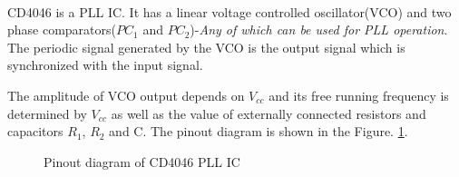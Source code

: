 \paragraph{}


CD4046 is a PLL IC. It has a linear voltage controlled oscillator(VCO) and two phase comparators($PC_1$ and $PC_2$)-\emph{Any of which can be used for PLL operation}. The periodic signal generated by the VCO is the output signal which is synchronized with the input signal. 

The amplitude of VCO output depends on $V_{cc}$ and its free running frequency is determined by $V_{cc}$ as well as the value of externally connected resistors and capacitors $R_1$, $R_2$ and C. The pinout diagram is shown in the Figure. \ref{pll4046}.

\begin{figure}
\caption{Pinout diagram of CD4046 PLL IC}
\label{pll4046}
\end{figure}


